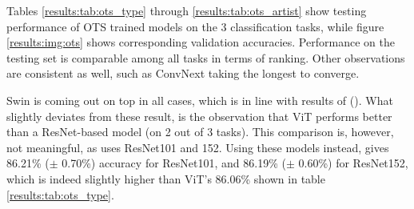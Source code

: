 \begin{table}[tb]
\caption{Artist classification off the shelf}
\label{results:tab:ots_artist}
\end{table}


Tables \ref{results:tab:ots_type} through \ref{results:tab:ots_artist} show testing performance of OTS trained models on the 3 classification tasks, while figure \ref{results:img:ots} shows corresponding validation accuracies. Performance on the testing set is comparable among all tasks in terms of ranking. Other observations are consistent as well, such as ConvNext taking the longest to converge.

Swin is coming out on top in all cases, which is in line with results of \citeauthor{zhou2021convnets} (\citeyear{zhou2021convnets}). What slightly deviates from these result, is the observation that ViT performs better than a ResNet-based model (on 2 out of 3 tasks). This comparison is, however, not meaningful, as \citeauthor{zhou2021convnets} uses ResNet101 and 152. Using these models instead, gives 86.21\% ($\pm$ 0.70\%) accuracy for ResNet101, and 86.19\% ($\pm$ 0.60\%) for ResNet152, which is indeed slightly higher than ViT's 86.06\% shown in table \ref{results:tab:ots_type}.


